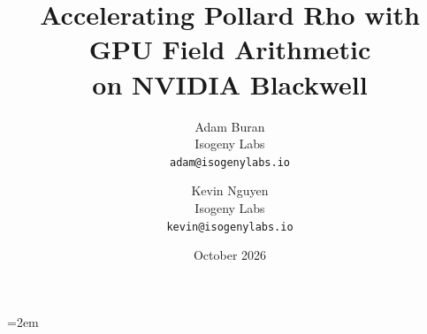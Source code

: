 \documentclass[11pt,a4paper]{article}
\title{Accelerating Pollard Rho with GPU Field Arithmetic\\
       on NVIDIA Blackwell}
\author{Adam Buran\\ Isogeny Labs\\ \texttt{adam@isogenylabs.io}
  \and Kevin Nguyen\\ Isogeny Labs\\ \texttt{kevin@isogenylabs.io}}
\date{October 2026}
\theoremstyle{definition}
\begin{document}
\maketitle
\emergencystretch=2em

\begin{abstract}

\end{abstract}

\clearpage
\tableofcontents
\clearpage
























\end{document}

